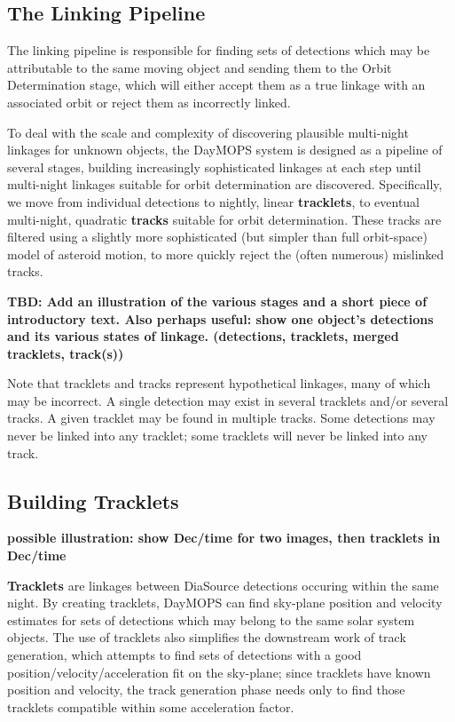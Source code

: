 \subsection{The Linking Pipeline}
The linking pipeline is responsible for finding sets of detections
which may be attributable to the same moving object and sending them
to the Orbit Determination stage, which will either accept them as a
true linkage with an associated orbit or reject them as incorrectly
linked.  

To deal with the scale and complexity of discovering plausible
multi-night linkages for unknown objects, the DayMOPS system is
designed as a pipeline of several stages, building increasingly
sophisticated linkages at each step until multi-night linkages
suitable for orbit determination are discovered.  Specifically, we
move from individual detections to nightly, linear \textbf{tracklets},
to eventual multi-night, quadratic \textbf{tracks} suitable for orbit
determination.  These tracks are filtered using a slightly more
sophisticated (but simpler than full orbit-space) model of asteroid
motion, to more quickly reject the (often numerous) mislinked tracks.

\textbf{TBD: Add an illustration of the various stages and a short piece of
introductory text.  Also perhaps useful: show one object's detections and its various states of linkage. (detections, tracklets, merged tracklets, track(s))}


Note that tracklets and tracks represent hypothetical linkages, many
of which may be incorrect.  A single detection may exist in several
tracklets and/or several tracks.  A given tracklet may be found in
multiple tracks.  Some detections may never be linked into any
tracklet; some tracklets will never be linked into any track.  




\subsection{Building Tracklets}

\textbf{ possible illustration: show Dec/time for two images, then tracklets in Dec/time}

\textbf{Tracklets} are linkages between DiaSource detections occuring
within the same night. By creating tracklets, DayMOPS can find
sky-plane position and velocity estimates for sets of detections which
may belong to the same solar system objects.  The use of tracklets
also simplifies the downstream work of track generation, which
attempts to find sets of detections with a good
position/velocity/acceleration fit on the sky-plane; since tracklets
have known position and velocity, the track generation phase needs
only to find those tracklets compatible within some acceleration
factor.

